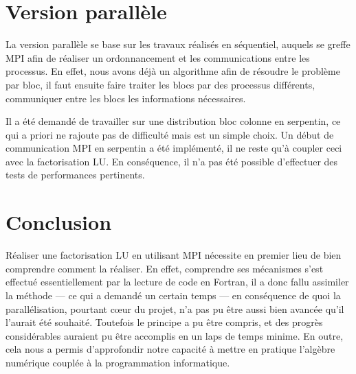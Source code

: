 \documentclass[a4paper,11pt]{article}
\begin{document}
\section{Version parallèle}

La version parallèle se base sur les travaux réalisés en séquentiel, auquels se greffe MPI afin de réaliser un ordonnancement et les communications entre les processus. En effet, nous avons déjà un algorithme afin de résoudre le problème par bloc, il faut ensuite faire traiter les blocs par des processus différents, communiquer entre les blocs les informations nécessaires.

Il a été demandé de travailler sur une distribution bloc colonne en serpentin, ce qui a priori ne rajoute pas de difficulté mais est un simple choix. Un début de communication MPI en serpentin a été implémenté, il ne reste qu'à coupler ceci avec la factorisation LU. En conséquence, il n'a pas été possible d'effectuer des tests de performances pertinents.

\section{Conclusion}

Réaliser une factorisation LU en utilisant MPI nécessite en premier lieu de bien comprendre comment la réaliser. En effet, comprendre ses mécanismes s'est effectué essentiellement par la lecture de code en Fortran, il a donc fallu assimiler la méthode --- ce qui a demandé un certain temps --- en conséquence de quoi la parallélisation, pourtant cœur du projet, n'a pas pu être aussi bien avancée qu'il l'aurait été souhaité. Toutefois le principe a pu être compris, et des progrès considérables auraient pu être accomplis en un laps de temps minime. En outre, cela nous a permis  d'approfondir notre capacité à mettre en pratique l'algèbre numérique couplée à la programmation informatique.
\end{document}
